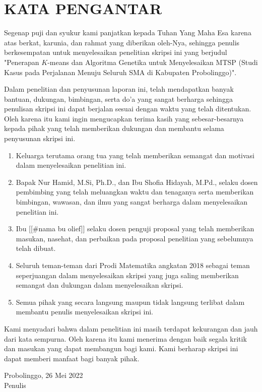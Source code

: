 \newpage
\chapter*{KATA PENGANTAR}

Segenap puji dan syukur kami panjatkan kepada Tuhan Yang Maha Esa karena atas berkat, karunia, dan rahmat yang diberikan oleh-Nya, sehingga penulis berkesempatan untuk menyelesaikan penelitian skripsi ini yang berjudul "Penerapan $K$-means dan Algoritma Genetika untuk Menyelesaikan MTSP (Studi Kasus pada Perjalanan Menuju Seluruh SMA di Kabupaten Probolinggo)".

Dalam penelitian dan penyusunan laporan ini, telah mendapatkan banyak bantuan, dukungan, bimbingan, serta do'a yang sangat berharga sehingga penulisan skripsi ini dapat berjalan sesuai dengan waktu yang telah ditentukan.
Oleh karena itu kami ingin mengucapkan terima kasih yang sebesar-besarnya kepada pihak yang telah memberikan dukungan dan membantu selama penyusunan skripsi ini.

\begin{enumerate}
	\item Keluarga terutama orang tua yang telah memberikan semangat dan motivasi dalam menyelesaikan penelitian ini.
	\item Bapak Nur Hamid, M.Si, Ph.D., dan Ibu Shofia Hidayah, M.Pd., selaku dosen pembimbing yang telah meluangkan waktu dan tenaganya serta memberikan bimbingan, wawasan, dan ilmu yang sangat berharga dalam menyelesaikan penelitian ini.
	\item Ibu [[\#nama bu olief]] selaku dosen penguji proposal yang telah memberikan masukan, nasehat, dan perbaikan pada proposal penelitian yang sebelumnya telah dibuat.
	\item Seluruh teman-teman dari Prodi Matematika angkatan 2018 sebagai teman seperjuangan dalam menyelesaikan skripsi yang juga saling memberikan semangat dan dukungan dalam menyelesaikan skripsi.
	\item Semua pihak yang secara langsung maupun tidak langsung terlibat dalam membantu penulis menyelesaikan skripsi ini.
\end{enumerate}

Kami menyadari bahwa dalam penelitian ini masih terdapat kekurangan dan jauh dari kata sempurna. Oleh karena itu kami menerima dengan baik segala kritik dan masukan yang dapat membangun bagi kami. Kami berharap skripsi ini dapat memberi manfaat bagi banyak pihak.

\begin{flushright}
Probolinggo, 26 Mei 2022\\
Penulis
\end{flushright}